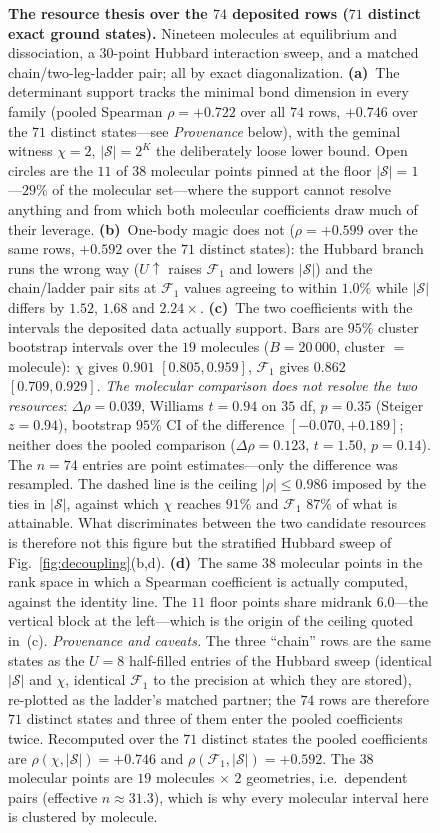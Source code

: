 \begin{figure}[tp]\centering

\caption{\label{fig:master}\textbf{The resource thesis over the $74$ deposited rows
($71$ distinct exact ground states).} Nineteen molecules at equilibrium and dissociation, a
$30$-point Hubbard interaction sweep, and a matched chain/two-leg-ladder pair; all by exact
diagonalization.
\textbf{(a)}~The determinant support tracks the minimal bond dimension in every family (pooled
Spearman $\rho=+0.722$ over all $74$ rows, $+0.746$ over the $71$ distinct states---see
\emph{Provenance} below), with the geminal witness $\chi{=}2$, $|\mathcal S|{=}2^{K}$ the
deliberately loose lower bound. Open circles are the $11$ of $38$ molecular points pinned at the
floor $|\mathcal S|=1$---$29\%$ of the molecular set---where the support cannot resolve anything
and from which both molecular coefficients draw much of their leverage.
\textbf{(b)}~One-body magic does not ($\rho=+0.599$ over the same rows, $+0.592$ over the $71$
distinct states): the Hubbard branch runs
the wrong way ($U\!\uparrow$ raises $\mathcal F_1$ and lowers $|\mathcal S|$) and the
chain/ladder pair sits at $\mathcal F_1$ values agreeing to within $1.0\%$ while $|\mathcal S|$
differs by $1.52$, $1.68$ and $2.24\times$.
\textbf{(c)}~The two coefficients with the intervals the deposited data actually support. Bars
are $95\%$ cluster bootstrap intervals over the $19$ molecules ($B=20\,000$, cluster $=$
molecule): $\chi$ gives $0.901$ $[0.805,0.959]$, $\mathcal F_1$ gives $0.862$ $[0.709,0.929]$.
\emph{The molecular comparison does not resolve the two resources}: $\Delta\rho=0.039$,
Williams $t=0.94$ on $35$ df, $p=0.35$ (Steiger $z=0.94$), bootstrap $95\%$ CI of the difference
$[-0.070,+0.189]$; neither does the pooled comparison ($\Delta\rho=0.123$, $t=1.50$, $p=0.14$).
The $n=74$ entries are point estimates---only the difference was resampled. The dashed line is
the ceiling $|\rho|\le0.986$ imposed by the ties in $|\mathcal S|$, against which $\chi$ reaches
$91\%$ and $\mathcal F_1$ $87\%$ of what is attainable. What discriminates between the two
candidate resources is therefore not this figure but the stratified Hubbard sweep of
Fig.~\ref{fig:decoupling}(b,d).
\textbf{(d)}~The same $38$ molecular points in the rank space in which a Spearman coefficient is
actually computed, against the identity line. The $11$ floor points share midrank $6.0$---the
vertical block at the left---which is the origin of the ceiling quoted in~(c).
\emph{Provenance and caveats.} The three ``chain'' rows are the same states as the $U=8$
half-filled entries of the Hubbard sweep (identical $|\mathcal S|$ and $\chi$, identical
$\mathcal F_1$ to the precision at which they are stored), re-plotted as the ladder's matched
partner; the $74$ rows are therefore $71$ distinct states and three of them enter the pooled
coefficients twice. Recomputed over the $71$ distinct states the pooled coefficients are
$\rho(\chi,|\mathcal S|)=+0.746$ and $\rho(\mathcal F_1,|\mathcal S|)=+0.592$. The $38$
molecular points are $19$ molecules $\times$ $2$ geometries, i.e.\ dependent pairs (effective
$n\approx31.3$), which is why every molecular interval here is clustered by molecule.}
\end{figure}
